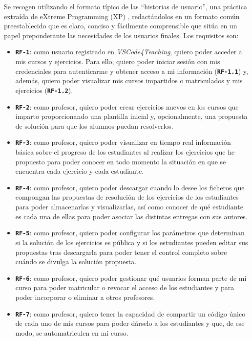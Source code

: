 Se recogen utilizando el formato típico de las ``historias de usuario'', una práctica extraída de eXtreme Programming (XP) \cite{XP_HistoriasUsuario}, redactándolos en un formato común preestablecido que es claro, conciso y fácilmente comprensible que sitúa en un papel preponderante las necesidades de los usuarios finales. Los requisitos son:
\begin{itemize}
    \item \texttt{\textbf{RF-1}}: como usuario registrado en \textit{VSCode4Teaching}, quiero poder acceder a mis cursos y ejercicios. Para ello, quiero poder iniciar sesión con mis credenciales para autenticarme y obtener acceso a mi información (\texttt{\textbf{RF-1.1}}) y, además, quiero poder visualizar mis cursos impartidos o matriculados y mis ejercicios (\texttt{\textbf{RF-1.2}}).
    \item \texttt{\textbf{RF-2}}: como profesor, quiero poder crear ejercicios nuevos en los cursos que imparto proporcionando una plantilla inicial y, opcionalmente, una propuesta de solución para que los alumnos puedan resolverlos.
    \item \texttt{\textbf{RF-3}}: como profesor, quiero poder visualizar en tiempo real información básica sobre el progreso de los estudiantes al realizar los ejercicios que he propuesto para poder conocer en todo momento la situación en que se encuentra cada ejercicio y cada estudiante.
    \item \texttt{\textbf{RF-4}}: como profesor, quiero poder descargar cuando lo desee los ficheros que compongan las propuestas de resolución de los ejercicios de los estudiantes para poder almacenarlas y visualizarlas, así como conocer de qué estudiante es cada una de ellas para poder asociar las distintas entregas con sus autores.
    \item \texttt{\textbf{RF-5}}: como profesor, quiero poder configurar los parámetros que determinan si la solución de los ejercicios es pública y si los estudiantes pueden editar sus propuestas tras descargarla para poder tener el control completo sobre cuándo se divulga la solución propuesta.
    \item \texttt{\textbf{RF-6}}: como profesor, quiero poder gestionar qué usuarios forman parte de mi curso para poder matricular o revocar el acceso de los estudiantes y para poder incorporar o eliminar a otros profesores.
    \item \texttt{\textbf{RF-7}}: como profesor, quiero tener la capacidad de compartir un código único de cada uno de mis cursos para poder dárselo a los estudiantes y que, de ese modo, se automatriculen en mi curso.

\end{itemize}
